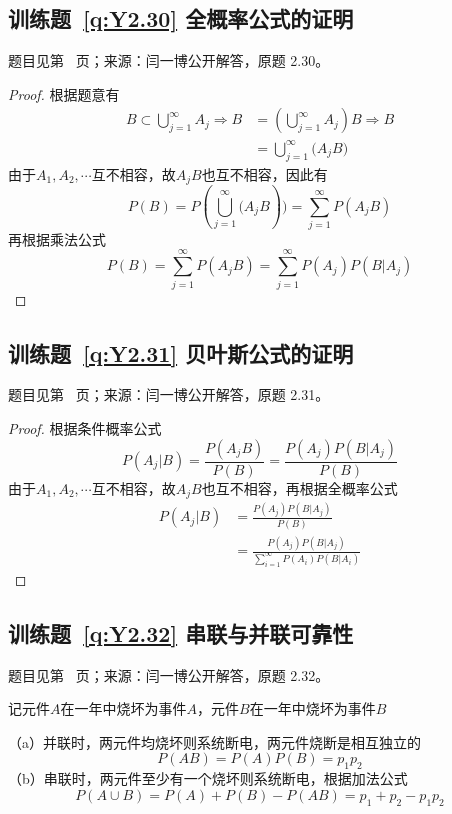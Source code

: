\subsection*{训练题~\ref{q:Y2.30} 全概率公式的证明}\label{a:Y2.30}{\small 题目见第~\pageref{q:Y2.30} 页；来源：闫一博公开解答，原题 2.30。}
\begin{proof}
根据题意有
\[\begin{aligned}B \subset \bigcup\limits_{j = 1}^\infty  {{A_j}}  \Rightarrow B &= (\bigcup\limits_{j = 1}^\infty  {{A_j}} )B \Rightarrow B \\&= \bigcup\limits_{j = 1}^\infty  {({A_j}} B)\end{aligned}\]
由于$A_1,A_2,\cdots$互不相容，故$A_jB$也互不相容，因此有
\[P(B) = P(\bigcup\limits_{j = 1}^\infty  {({A_j}} B)) = \sum\limits_{j = 1}^\infty  {P({A_j}B)} \]
再根据乘法公式
\[P(B) = \sum\limits_{j = 1}^\infty  {P({A_j}B)}  = \sum\limits_{j = 1}^\infty  {P({A_j})P(B|{A_j})} \]
\end{proof}

\subsection*{训练题~\ref{q:Y2.31} 贝叶斯公式的证明}\label{a:Y2.31}{\small 题目见第~\pageref{q:Y2.31} 页；来源：闫一博公开解答，原题 2.31。}
\begin{proof}
根据条件概率公式
  \[P({A_j}|B) = \frac{{P({A_j}B)}}{{P(B)}} = \frac{{P({A_j})P(B|{A_j})}}{{P(B)}}\]
由于$A_1,A_2,\cdots$互不相容，故$A_jB$也互不相容，再根据全概率公式
\[\begin{aligned}P({A_j}|B) &= \frac{{P({A_j})P(B|{A_j})}}{{P(B)}} \\&= \frac{{P({A_j})P(B|{A_j})}}{{\sum\limits_{i = 1}^\infty  {P({A_i})P(B|{A_i})} }}\end{aligned}\]

\end{proof}

\subsection*{训练题~\ref{q:Y2.32} 串联与并联可靠性}\label{a:Y2.32}{\small 题目见第~\pageref{q:Y2.32} 页；来源：闫一博公开解答，原题 2.32。}
\begin{solve}
记元件$A$在一年中烧坏为事件$A$，元件$B$在一年中烧坏为事件$B$

（a）并联时，两元件均烧坏则系统断电，两元件烧断是相互独立的
\[P(AB) = P(A)P(B) = {p_1}{p_2}\]
（b）串联时，两元件至少有一个烧坏则系统断电，根据加法公式
\[P(A \cup B) = P(A) + P(B) - P(AB) = {p_1} + {p_2} - {p_1}{p_2}\]
\end{solve}

